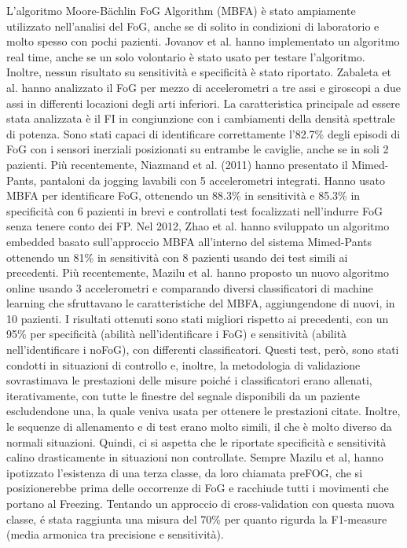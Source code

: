 L'algoritmo Moore-Bächlin FoG Algorithm (MBFA) è stato ampiamente utilizzato nell'analisi del FoG, anche se di solito in condizioni di laboratorio e molto spesso con pochi pazienti. Jovanov et al. hanno implementato un algoritmo real time, anche se un solo volontario è stato usato per testare l'algoritmo. Inoltre, nessun risultato su sensitività e specificità è stato riportato\cite{22}. Zabaleta et al. hanno analizzato il FoG per mezzo di accelerometri a tre assi e giroscopi a due assi in differenti locazioni degli arti inferiori. La caratteristica principale ad essere stata analizzata è il FI in congiunzione con i cambiamenti della densità spettrale di potenza. Sono stati capaci di identificare correttamente l'82.7\% degli episodi di FoG con i sensori inerziali posizionati su entrambe le caviglie, anche se in soli 2 pazienti\cite{24}.  \newline
Più recentemente, Niazmand et al. (2011) hanno presentato il Mimed-Pants\cite{26}, pantaloni da jogging lavabili con 5 accelerometri integrati. Hanno usato MBFA per identificare FoG, ottenendo un 88.3\% in sensitività e 85.3\% in specificità con 6 pazienti in brevi e controllati test focalizzati nell'indurre FoG senza tenere conto dei FP. Nel 2012, Zhao et al.\cite{46} hanno sviluppato un algoritmo embedded basato sull'approccio MBFA all'interno del sistema Mimed-Pants ottenendo un 81\% in sensitività con 8 pazienti usando dei test simili ai precedenti. Più recentemente, Mazilu et al. hanno proposto un nuovo algoritmo online usando 3 accelerometri e comparando diversi classificatori di machine learning che sfruttavano le caratteristiche del MBFA, aggiungendone di nuovi, in 10 pazienti\cite{48}. I risultati ottenuti sono stati migliori rispetto ai precedenti, con un 95\% per specificità (abilità nell'identificare i FoG) e sensitività (abilità nell'identificare i noFoG), con differenti classificatori. Questi test, però, sono stati condotti in situazioni di controllo e, inoltre, la metodologia di validazione sovrastimava le prestazioni delle misure poiché i classificatori erano allenati, iterativamente, con tutte le finestre del segnale disponibili da un paziente escludendone una, la quale veniva usata per ottenere le prestazioni citate. Inoltre, le sequenze di allenamento e di test erano molto simili, il che è molto diverso da normali situazioni. Quindi, ci si aspetta che le riportate specificità e sensitività calino drasticamente in situazioni non controllate. Sempre Mazilu et al, hanno ipotizzato l'esistenza di una terza classe, da loro chiamata preFOG, che si posizionerebbe prima delle occorrenze di FoG e racchiude tutti i movimenti che portano al Freezing. Tentando un approccio di cross-validation con questa nuova classe, é stata raggiunta una misura del 70\% per quanto rigurda la F1-measure (media armonica tra precisione e sensitività).\cite{12} \newline
